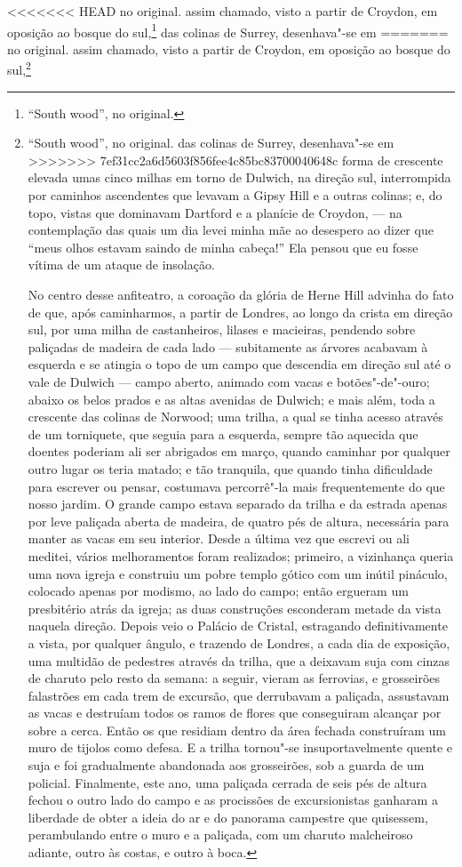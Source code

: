 {{{{{{{{{{{{{{{{{<<<<<<< HEAD
  no original.} assim chamado, visto a partir de
Croydon, em oposição ao bosque do sul,\footnote{``South wood'', no
  original.} das colinas de Surrey, desenhava"-se em
=======
  no original.  assim chamado, visto a partir de
Croydon, em oposição ao bosque do sul,\footnote{``South wood'', no
  original.  das colinas de Surrey, desenhava"-se em
>>>>>>> 7ef31cc2a6d5603f856fee4c85bc83700040648c
forma de crescente elevada umas cinco milhas em torno de Dulwich, na
direção sul, interrompida por caminhos ascendentes que levavam a Gipsy
Hill e a outras colinas; e, do topo, vistas que dominavam Dartford e a
planície de Croydon, --- na contemplação das quais um dia levei minha mãe
ao desespero ao dizer que ``meus olhos estavam saindo de minha cabeça!''
Ela pensou que eu fosse vítima de um ataque de insolação.

No centro desse anfiteatro, a coroação da glória de Herne Hill \label{herne}
advinha do fato de que, após caminharmos, a partir de Londres, ao longo
da crista em direção sul, por uma milha de castanheiros, lilases e
macieiras, pendendo sobre paliçadas de madeira de cada lado ---
subitamente as árvores acabavam à esquerda e se atingia o topo de um
campo que descendia em direção sul até o vale de Dulwich --- campo
aberto, animado com vacas e botões"-de"-ouro; abaixo os belos prados e as
altas avenidas de Dulwich; e mais além, toda a crescente das colinas de
Norwood; uma trilha, a qual se tinha acesso através de um torniquete,
que seguia para a esquerda, sempre tão aquecida que doentes poderiam ali
ser abrigados em março, quando caminhar por qualquer outro lugar os
teria matado; e tão tranquila, que quando tinha dificuldade para
escrever ou pensar, costumava percorrê"-la mais frequentemente do que
nosso jardim. O grande campo estava separado da trilha e da estrada
apenas por leve paliçada aberta de madeira, de quatro pés de altura,
necessária para manter as vacas em seu interior. Desde a última vez que
escrevi ou ali meditei, vários melhoramentos foram realizados; primeiro,
a vizinhança queria uma nova igreja e construiu um pobre templo gótico
com um inútil pináculo, colocado apenas por modismo, ao lado do campo;
então ergueram um presbitério atrás da igreja; as duas construções
esconderam metade da vista naquela direção. Depois veio o Palácio de
Cristal, estragando definitivamente a vista, por qualquer ângulo, e
trazendo de Londres, a cada dia de exposição, uma multidão de pedestres
através da trilha, que a deixavam suja com cinzas de charuto pelo resto
da semana: a seguir, vieram as ferrovias, e grosseirões falastrões em
cada trem de excursão, que derrubavam a paliçada, assustavam as vacas e
destruíam todos os ramos de flores que conseguiram alcançar por sobre a
cerca. Então os que residiam dentro da área fechada construíram um muro
de tijolos como defesa. E a trilha tornou"-se insuportavelmente quente e
suja e foi gradualmente abandonada aos grosseirões, sob a guarda de um
policial. Finalmente, este ano, uma paliçada cerrada de seis pés de
altura fechou o outro lado do campo e as procissões de excursionistas
ganharam a liberdade de obter a ideia do ar e do panorama campestre que
quisessem, perambulando entre o muro e a paliçada, com um charuto
malcheiroso adiante, outro às costas, e outro à boca.

}}}}}}}}}}}}}}}}}
